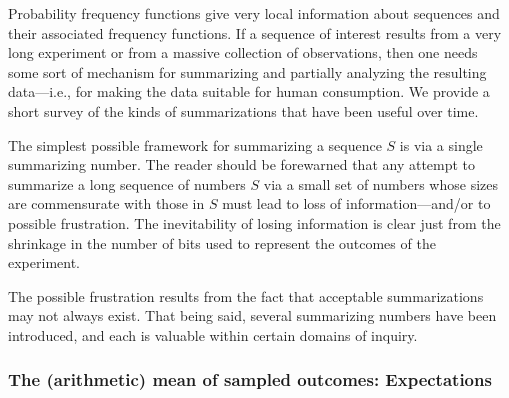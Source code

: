 
\bigskip

Probability frequency functions give very local information about sequences and their associated frequency functions.  If a sequence of interest results from a very long experiment or from a massive collection of observations, then one needs some sort of mechanism for summarizing and partially analyzing the resulting data---i.e., for making the data suitable for human consumption.  We provide a short survey of the kinds of summarizations that have been useful over time.

\medskip

The simplest possible framework for summarizing a sequence $S$ is via a single summarizing number. The reader should be forewarned that any attempt to summarize a long sequence of numbers $S$ via a small set of numbers whose sizes are commensurate with those in $S$ must lead to loss of information---and/or to possible frustration.  The inevitability of losing information is clear just from the shrinkage in the number of bits used to represent the outcomes of the experiment.

\bigskip

\noindent {}

\bigskip


\noindent
The possible frustration results from the fact that acceptable summarizations may not
always exist.   That being said, several summarizing numbers have been introduced, and
each is valuable within certain domains of inquiry. 

\subsubsection{The (arithmetic) mean of sampled outcomes: Expectations}
\label{sec:mean}

